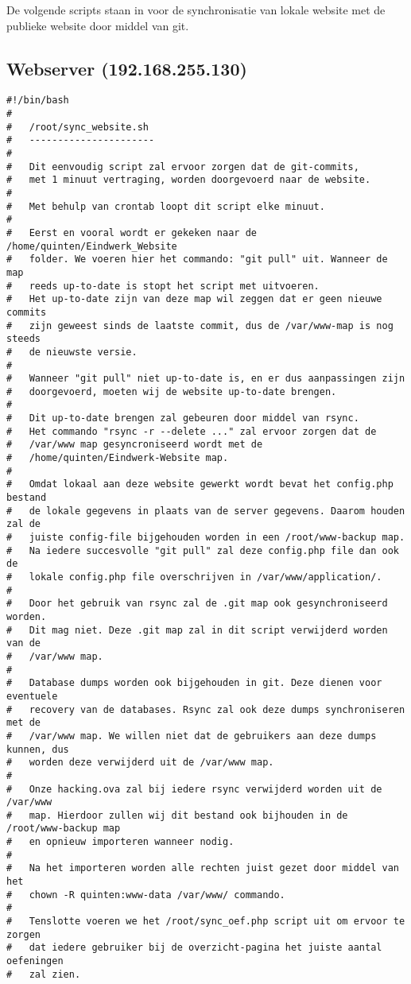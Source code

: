 De volgende scripts staan in voor de synchronisatie van lokale website met de publieke website door middel van git.
\subsection{Webserver (192.168.255.130)}
\begin{lstlisting}
#!/bin/bash
#      
#	/root/sync_website.sh
#	----------------------
#
#	Dit eenvoudig script zal ervoor zorgen dat de git-commits,
#	met 1 minuut vertraging, worden doorgevoerd naar de website.
#
#	Met behulp van crontab loopt dit script elke minuut.
#
#	Eerst en vooral wordt er gekeken naar de /home/quinten/Eindwerk_Website
#	folder. We voeren hier het commando: "git pull" uit. Wanneer de map 
#	reeds up-to-date is stopt het script met uitvoeren.
#	Het up-to-date zijn van deze map wil zeggen dat er geen nieuwe commits
#	zijn geweest sinds de laatste commit, dus de /var/www-map is nog steeds
#	de nieuwste versie.
#
#	Wanneer "git pull" niet up-to-date is, en er dus aanpassingen zijn
#	doorgevoerd, moeten wij de website up-to-date brengen.
#
#	Dit up-to-date brengen zal gebeuren door middel van rsync.
#	Het commando "rsync -r --delete ..." zal ervoor zorgen dat de
#	/var/www map gesyncroniseerd wordt met de 
#	/home/quinten/Eindwerk-Website map.
#
#	Omdat lokaal aan deze website gewerkt wordt bevat het config.php bestand
#	de lokale gegevens in plaats van de server gegevens. Daarom houden zal de
#	juiste config-file bijgehouden worden in een /root/www-backup map.
#	Na iedere succesvolle "git pull" zal deze config.php file dan ook de 
#	lokale config.php file overschrijven in /var/www/application/.
#
#	Door het gebruik van rsync zal de .git map ook gesynchroniseerd worden.
#	Dit mag niet. Deze .git map zal in dit script verwijderd worden van de 
#	/var/www map.
#
#	Database dumps worden ook bijgehouden in git. Deze dienen voor eventuele
#	recovery van de databases. Rsync zal ook deze dumps synchroniseren met de
#	/var/www map. We willen niet dat de gebruikers aan deze dumps kunnen, dus
#	worden deze verwijderd uit de /var/www map.
#
#	Onze hacking.ova zal bij iedere rsync verwijderd worden uit de /var/www
#	map. Hierdoor zullen wij dit bestand ook bijhouden in de /root/www-backup map
#	en opnieuw importeren wanneer nodig.
#
#	Na het importeren worden alle rechten juist gezet door middel van het 
#	chown -R quinten:www-data /var/www/ commando.
#
#	Tenslotte voeren we het /root/sync_oef.php script uit om ervoor te zorgen
#	dat iedere gebruiker bij de overzicht-pagina het juiste aantal oefeningen
#	zal zien.
   

\end{lstlisting}
